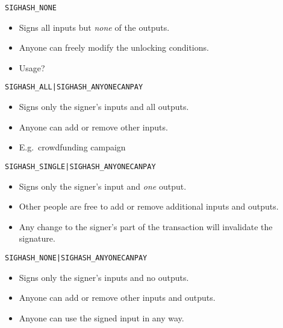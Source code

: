 \documentclass[]{beamer}
\begin{document}
\begin{frame}{\texttt{SIGHASH\_NONE}}
	\begin{figure}
			
	\end{figure}
	\begin{itemize}
		\item Signs all inputs but \emph{none} of the outputs.
		\item Anyone can freely modify the unlocking conditions.
		\item Usage?
	\end{itemize}
\end{frame}

\begin{frame}{\texttt{SIGHASH\_ALL|SIGHASH\_ANYONECANPAY}}
	\begin{figure}
		
	\end{figure}
	\begin{itemize}
		\item Signs only the signer's inputs and all outputs.
		\item Anyone can add or remove other inputs.
		\item E.g.\ crowdfunding campaign
	\end{itemize}
\end{frame}

\begin{frame}{\texttt{SIGHASH\_SINGLE|SIGHASH\_ANYONECANPAY}}
	\begin{figure}
			
	\end{figure}
	\begin{itemize}
		\item Signs only the signer's input and \emph{one} output.
		\item Other people are free to add or remove additional inputs and outputs.\\
		\item Any change to the signer's part of the transaction will invalidate the signature.	
	\end{itemize}
\end{frame}

\begin{frame}{\texttt{SIGHASH\_NONE|SIGHASH\_ANYONECANPAY}}
	\begin{figure}
		
	\end{figure}
	\begin{itemize}
		\item Signs only the signer's inputs and no outputs.
		\item Anyone can add or remove other inputs and outputs.
		\item Anyone can use the signed input in any way.	
	\end{itemize}
\end{frame}
\end{document}
